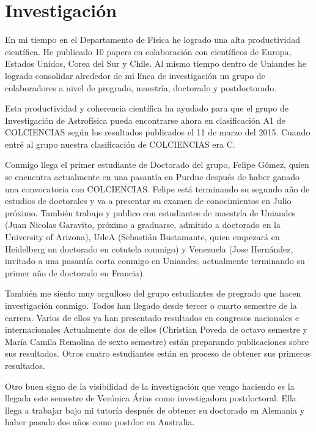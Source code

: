 \documentclass[letterpaper,12pt,onecolumn]{article}
\begin{document}
\section{{\Large{\sc Investigaci\'on}}}

En mi tiempo en el Departamento de F\'isica he logrado una alta
productividad cient\'ifica. He publicado 10 papers en colaboraci\'on
con cient\'ificos de Europa, Estados Unidos, Corea del Sur y Chile. Al
mismo tiempo dentro de Uniandes he logrado consolidar alrededor de mi
l\'inea de investigaci\'on un grupo de colaboradores a nivel de
pregrado, maestr\'ia, doctorado y postdoctorado. 

Esta productividad y coherencia cient\'ifica ha ayudado para que el grupo de
Investigaci\'on de Astrof\'isica pueda encontrarse ahora en clasificaci\'on
A1 de COLCIENCIAS seg\'un los resultados publicados el 11 de marzo del
2015. Cuando entr\'e al grupo nuestra clasificaci\'on de COLCIENCIAS era C.   

Conmigo llega el primer estudiante de Doctorado del grupo, Felipe
G\'omez, quien se encuentra actualmente en una pasant\'ia en Purdue
despu\'es de haber ganado una convocatoria con COLCIENCIAS. Felipe
est\'a terminando su segundo a\~no de estudios de doctorales y va a
presentar su examen de conocimientos en Julio pr\'oximo. Tambi\'en
trabajo y publico con estudiantes de maestr\'ia de Uniandes (Juan
Nicolas Garavito, pr\'oximo a graduarse, admitido a doctorado en la
University of Arizona), UdeA (Sebasti\'an
Bustamante, quien empezar\'a en Heidelberg un doctorado en cotutela conmigo)
y Venezuela (Jose Hern\'andez, invitado a una pasant\'ia corta conmigo
en Uniandes, actualmente terminando su primer a\~no de doctorado en
Francia).   

Tambi\'en me siento muy orgulloso del grupo estudiantes de pregrado que
hacen investigaci\'on conmigo. Todos han llegado desde tercer o cuarto
semestre de la carrera. Varios de ellos ya han presentado resultados
en congresos nacionales e internacionales Actualmente dos de ellos
(Christian Poveda de octavo semestre y Mar\'ia Camila Remolina de
sexto semestre) est\'an preparando publicaciones sobre sus
resultados. Otros cuatro estudiantes est\'an en proceso de obtener sus
primeros resultados.  

Otro buen signo de la visibilidad de la investigaci\'on que vengo
haciendo es la llegada este semestre de Ver\'onica \'Arias como 
investigadora postdoctoral. Ella llega a trabajar bajo mi
tutor\'ia despu\'es de obtener su doctorado en Alemania y haber pasado
dos a\~nos como postdoc en Australia. 
\end{document}
